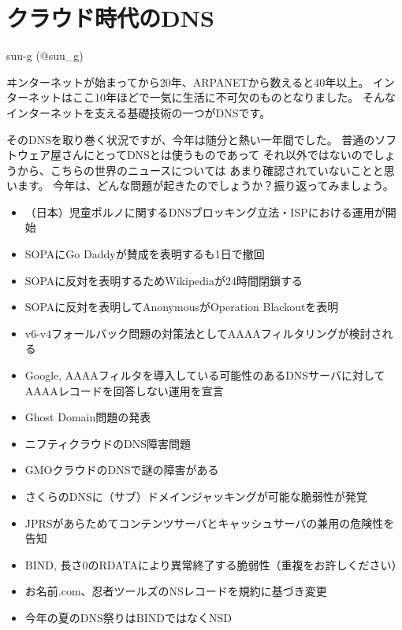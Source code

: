
\cleardoublepage
\plainifnotempty

\chapter{クラウド時代のDNS}
\begin{flushright}
suu-g (@suu\_g)
\end{flushright}

\lettrine{ヰ}
ンターネットが始まってから20年、ARPANETから数えると40年以上。
インターネットはここ10年ほどで一気に生活に不可欠のものとなりました。
そんなインターネットを支える基礎技術の一つがDNSです。

そのDNSを取り巻く状況ですが、今年は随分と熱い一年間でした。
普通のソフトウェア屋さんにとってDNSとは使うものであって
それ以外ではないのでしょうから、こちらの世界のニュースについては
あまり確認されていないことと思います。
今年は、どんな問題が起きたのでしょうか？振り返ってみましょう。
\begin{itemize}
  \item （日本）児童ポルノに関するDNSブロッキング立法・ISPにおける運用が開始
  \item SOPAにGo Daddyが賛成を表明するも1日で撤回
  \item SOPAに反対を表明するためWikipediaが24時間閉鎖する
  \item SOPAに反対を表明してAnonymousがOperation Blackoutを表明
  \item v6-v4フォールバック問題の対策法としてAAAAフィルタリングが検討される
  \item Google, AAAAフィルタを導入している可能性のあるDNSサーバに対してAAAAレコードを回答しない運用を宣言
  \item Ghost Domain問題の発表
  \item ニフティクラウドのDNS障害問題
  \item GMOクラウドのDNSで謎の障害がある
  \item さくらのDNSに（サブ）ドメインジャッキングが可能な脆弱性が発覚
  \item JPRSがあらためてコンテンツサーバとキャッシュサーバの兼用の危険性を告知
  \item BIND, 長さ0のRDATAにより異常終了する脆弱性（重複をお許しください）
  \item お名前.com、忍者ツールズのNSレコードを規約に基づき変更
  \item 今年の夏のDNS祭りはBINDではなくNSD
\end{itemize}

